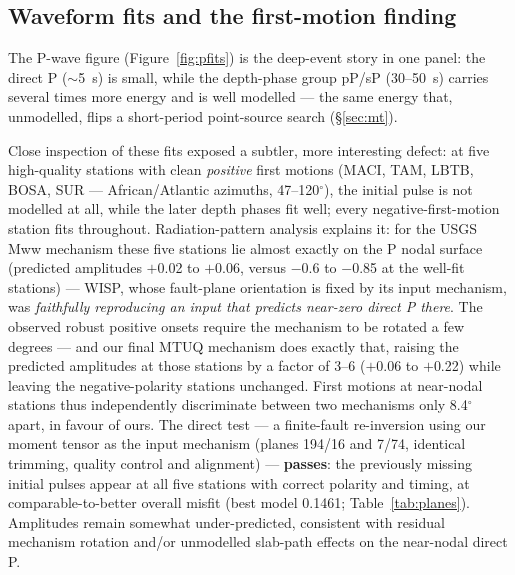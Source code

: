 \documentclass[11pt]{article}
\begin{document}
\subsection{Waveform fits and the first-motion finding}
\label{sec:polarity}
The P-wave figure (Figure~\ref{fig:pfits}) is the deep-event story in one panel: the direct P
($\sim$5~s) is small, while the depth-phase group pP/sP (30--50~s) carries several times more
energy and is well modelled --- the same energy that, unmodelled, flips a short-period
point-source search (\S\ref{sec:mt}).

Close inspection of these fits exposed a subtler, more interesting defect: at five
high-quality stations with clean \emph{positive} first motions (MACI, TAM, LBTB, BOSA, SUR ---
African/Atlantic azimuths, 47--120$^\circ$), the initial pulse is not modelled at all, while
the later depth phases fit well; every negative-first-motion station fits throughout.
Radiation-pattern analysis explains it: for the USGS Mww mechanism these five stations lie
almost exactly on the P nodal surface (predicted amplitudes $+$0.02 to $+$0.06, versus
$-$0.6 to $-$0.85 at the well-fit stations) --- WISP, whose fault-plane orientation is fixed by
its input mechanism, was \emph{faithfully reproducing an input that predicts near-zero direct
P there}. The observed robust positive onsets require the mechanism to be rotated a few
degrees --- and our final MTUQ mechanism does exactly that, raising the predicted amplitudes at
those stations by a factor of 3--6 ($+$0.06 to $+$0.22) while leaving the negative-polarity
stations unchanged. First motions at near-nodal stations thus independently discriminate
between two mechanisms only 8.4$^\circ$ apart, in favour of ours. The direct test --- a
finite-fault re-inversion using our moment tensor as the input mechanism (planes 194/16 and
7/74, identical trimming, quality control and alignment) --- \textbf{passes}: the previously
missing initial pulses appear at all five stations with correct polarity and timing, at
comparable-to-better overall misfit (best model 0.1461; Table~\ref{tab:planes}). Amplitudes remain somewhat
under-predicted, consistent with residual mechanism rotation and/or unmodelled slab-path
effects on the near-nodal direct P.
\end{document}
